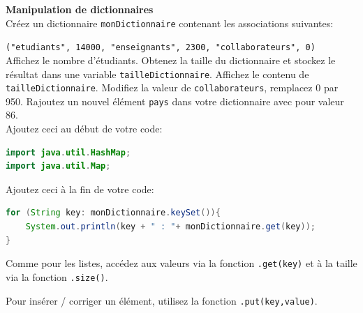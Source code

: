     \begin{Exercice}[15 minutes] [Java] \textbf{Manipulation de dictionnaires}\\
      	Créez un dictionnaire \lstinline{monDictionnaire} contenant les associations suivantes:
      	
      	\texttt{("etudiants", 14000, "enseignants", 2300, "collaborateurs", 0)}\\
      	
          Affichez le nombre d'étudiants. Obtenez la taille du dictionnaire et stockez le résultat dans une variable \lstinline{tailleDictionnaire}. Affichez le contenu de \lstinline{tailleDictionnaire}. 
          Modifiez la valeur de \lstinline{collaborateurs}, remplacez 0 par 950. Rajoutez un nouvel élément \lstinline{pays} dans votre dictionnaire avec pour valeur 86.\\
      	
      	Ajoutez ceci au début de votre code:
       
      	\begin{lstlisting}[language=Java]
import java.util.HashMap;
import java.util.Map; \end{lstlisting}
	     
	     Ajoutez ceci à la fin de votre code:
	     
	    \begin{lstlisting}[language=Java]
for (String key: monDictionnaire.keySet()){
    System.out.println(key + " : "+ monDictionnaire.get(key));
} \end{lstlisting} 
    
        \begin{conseil}
           Comme pour les listes, accédez aux valeurs via la fonction \lstinline{.get(key)} et à la taille via la fonction \lstinline{.size()}.
            
           Pour insérer / corriger un élément, utilisez la fonction \lstinline{.put(key,value)}.
        \end{conseil}
        
        \begin{solution}
            
        \end{solution}
    \end{Exercice}
    
